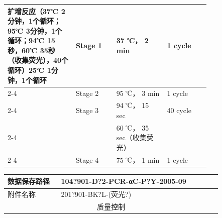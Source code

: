 \documentclass[UTF8,10pt,a4paper,fontset=fandol]{ctexart}
\newcommand{\fieldvalue}[1]{#1}
\newcommand{\handwritten}[1]{#1}
\begin{document}
\begin{tabular}{|p{0.27\linewidth}|p{0.16\linewidth}|p{0.20\linewidth}|p{0.17\linewidth}|}
\hline
扩增反应（37℃ 2分钟，1个循环；95℃ 3分钟，1个循环；94℃ 15秒，60℃ 35秒（收集荧光），40个循环）25℃ 1分钟，1个循环
&
Stage 1 &
\fieldvalue{\handwritten{37}} ℃，
\fieldvalue{\handwritten{2}} min &
\fieldvalue{\handwritten{1}} cycle\\
\cline{2-4}
&
Stage 2 &
\fieldvalue{\handwritten{95}} ℃，
\fieldvalue{\handwritten{3}} min &
\fieldvalue{\handwritten{1}} cycle\\
\cline{2-4}
&
Stage 3 &
\fieldvalue{\handwritten{94}} ℃，
\fieldvalue{\handwritten{15}} sec &
\fieldvalue{\handwritten{40}} cycle\\
\cline{2-4}
&
&
\fieldvalue{\handwritten{60}} ℃，
\fieldvalue{\handwritten{35}} sec（收集荧光）
&\\
\cline{2-4}
&
Stage 4 &
\fieldvalue{\handwritten{75}} ℃，
\fieldvalue{\handwritten{1}} min &
\fieldvalue{\handwritten{1}} cycle\\
\hline
\end{tabular}

\begin{tabular}{|p{0.23\linewidth}|p{0.69\linewidth}|}
\hline
数据保存路径 &
\fieldvalue{\handwritten{104?901-D?2-PCR-αC-P?Y-2005-09}}\\
\hline
附件名称 &
\fieldvalue{\handwritten{201?901-BK?L-(荧光?)}}\\
\hline
\multicolumn{2}{|c|}{质量控制}\\
\hline
\end{tabular}
\end{document}
